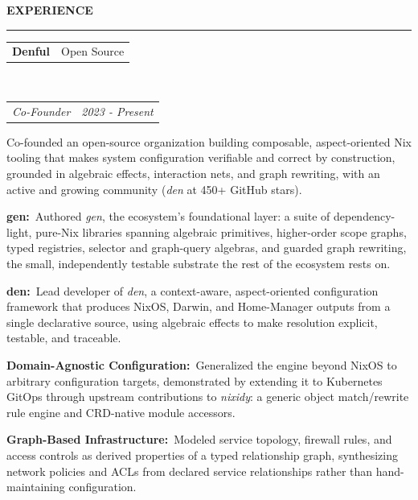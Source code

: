 \documentclass[11pt,letterpaper]{article}
\makeatletter
\newcommand{\area}[2]{{\bfseries\color{accent}#1:}~#2}
\newcommand{\header}[1]{%
  \vspace{6pt}%
  {\large\bfseries\color{accent}\MakeUppercase{#1}}\par\nobreak\vspace{-3pt}%
  {\color{accent}\rule{\linewidth}{0.9pt}}\par\nobreak\vspace{3pt}%
  \@afterheading}
\newcommand{\headerrow}[2]{%
  \begin{tabular*}{\linewidth}{@{}l@{\extracolsep{\fill}}r@{}}#1 & #2\end{tabular*}}
\newcommand{\employment}[5]{%
  \headerrow{\textbf{#1}}{\color{muted}#2}\\
  \headerrow{{\itshape\color{accent}#3}}{\color{muted}\itshape #4}
  \begin{itemize*}
    \item #5
  \end{itemize*}
}
\makeatother
\begin{document}
\header{Experience}
\employment{Denful}{Open Source}{Co-Founder}{2023 - Present}{
Co-founded an open-source organization building composable, aspect-oriented Nix tooling that makes system configuration verifiable and correct by construction, grounded in algebraic effects, interaction nets, and graph rewriting, with an active and growing community (\emph{den} at 450+ GitHub stars).
\item \area{gen}{Authored \emph{gen}, the ecosystem's foundational layer: a suite of dependency-light, pure-Nix libraries spanning algebraic primitives, higher-order scope graphs, typed registries, selector and graph-query algebras, and guarded graph rewriting, the small, independently testable substrate the rest of the ecosystem rests on.}
\item \area{den}{Lead developer of \emph{den}, a context-aware, aspect-oriented configuration framework that produces NixOS, Darwin, and Home-Manager outputs from a single declarative source, using algebraic effects to make resolution explicit, testable, and traceable.}
\item \area{Domain-Agnostic Configuration}{Generalized the engine beyond NixOS to arbitrary configuration targets, demonstrated by extending it to Kubernetes GitOps through upstream contributions to \emph{nixidy}: a generic object match/rewrite rule engine and CRD-native module accessors.}
\item \area{Graph-Based Infrastructure}{Modeled service topology, firewall rules, and access controls as derived properties of a typed relationship graph, synthesizing network policies and ACLs from declared service relationships rather than hand-maintaining configuration.}
}

\end{document}
